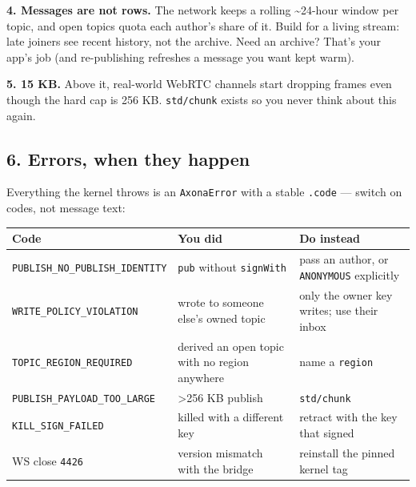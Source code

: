 \documentclass[
  nobib]{tufte-handout}
\newcounter{none} %
\begin{document}
\textbf{4. Messages are not rows.} The network keeps a rolling
\textasciitilde24-hour window per topic, and open topics quota each
author's share of it. Build for a living stream: late joiners see recent
history, not the archive. Need an archive? That's your app's job (and
re-publishing refreshes a message you want kept warm).

\textbf{5. 15 KB.} Above it, real-world WebRTC channels start dropping
frames even though the hard cap is 256 KB. \texttt{std/chunk} exists so
you never think about this again.

\subsection{6. Errors, when they happen}\label{errors-when-they-happen}

Everything the kernel throws is an \texttt{AxonaError} with a stable
\texttt{.code} --- switch on codes, not message text:

{\def\LTcaptype{none} %
\begin{longtable}[]{@{}
  >{\raggedright\arraybackslash}p{}
  >{\raggedright\arraybackslash}p{}
  >{\raggedright\arraybackslash}p{}@{}}
\toprule\noalign{}
\begin{minipage}[b]{\linewidth}\raggedright
Code
\end{minipage} & \begin{minipage}[b]{\linewidth}\raggedright
You did
\end{minipage} & \begin{minipage}[b]{\linewidth}\raggedright
Do instead
\end{minipage} \\
\midrule\noalign{}
\endhead
\bottomrule\noalign{}
\endlastfoot
\texttt{PUBLISH\_NO\_PUBLISH\_IDENTITY} & \texttt{pub} without
\texttt{signWith} & pass an author, or \texttt{ANONYMOUS} explicitly \\
\texttt{WRITE\_POLICY\_VIOLATION} & wrote to someone else's owned topic
& only the owner key writes; use their inbox \\
\texttt{TOPIC\_REGION\_REQUIRED} & derived an open topic with no region
anywhere & name a \texttt{region} \\
\texttt{PUBLISH\_PAYLOAD\_TOO\_LARGE} & \textgreater256 KB publish &
\texttt{std/chunk} \\
\texttt{KILL\_SIGN\_FAILED} & killed with a different key & retract with
the key that signed \\
WS close \texttt{4426} & version mismatch with the bridge & reinstall
the pinned kernel tag \\
\end{longtable}
}
\end{document}
